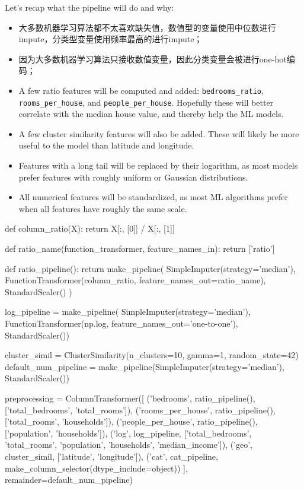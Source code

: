 Let's recap what the pipeline will do and why:
\begin{itemize}
    \item 大多数机器学习算法都不太喜欢缺失值，数值型的变量使用中位数进行impute，分类型变量使用频率最高的进行impute；
    \item 因为大多数机器学习算法只接收数值变量，因此分类变量会被进行one-hot编码；
    \item A few ratio features will be computed and added: \verb|bedrooms_ratio|,
    \verb|rooms_per_house|, and \verb|people_per_house|. Hopefully these will better correlate
    with the median house value, and thereby help the ML models.
    \item A few cluster similarity features will also be added. These will likely be more
    useful to the model than latitude and longitude.
    \item Features with a long tail will be replaced by their logarithm, as most models
    prefer features with roughly uniform or Gaussian distributions.
    
    \item All numerical features will be standardized, as most ML algorithms prefer when
    all features have roughly the same scale. 
\end{itemize}

\begin{pyc}
def column_ratio(X):
    return X[:, [0]] / X[:, [1]]

def ratio_name(function_transformer, feature_names_in):
    return ['ratio']

def ratio_pipeline():
    return make_pipeline(
        SimpleImputer(strategy='median'),
        FunctionTransformer(column_ratio, feature_names_out=ratio_name),
        StandardScaler()
    )
    
log_pipeline = make_pipeline(
    SimpleImputer(strategy='median'),
    FunctionTransformer(np.log, feature_names_out='one-to-one'),
    StandardScaler())

cluster_simil = ClusterSimilarity(n_clusters=10, gamma=1, random_state=42)
default_num_pipeline = make_pipeline(SimpleImputer(strategy='median'),
                                      StandardScaler())

preprocessing = ColumnTransformer([
    ('bedrooms', ratio_pipeline(), ['total_bedrooms', 'total_rooms']),
    ('rooms_per_house', ratio_pipeline(), ['total_rooms', 'households']),
    ('people_per_house', ratio_pipeline(), ['population', 'households']),
    ('log', log_pipeline, ['total_bedrooms', 'total_rooms', 'population', 
                             'households', 'median_income']),
    ('geo', cluster_simil, ['latitude', 'longitude']),
    ('cat', cat_pipeline, make_column_selector(dtype_include=object))
],
                                  remainder=default_num_pipeline)
\end{pyc}

